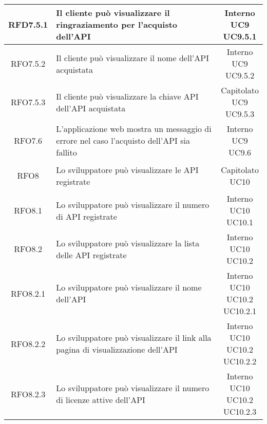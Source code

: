 \begin{longtable}{|c|p{8cm}|c|}
\hypertarget{RFD7.5.1}{RFD7.5.1} & Il cliente può visualizzare il ringraziamento per l'acquisto dell'API & \makecell*{Interno\\UC9\\UC9.5.1} \\
\hline
\hypertarget{RFO7.5.2}{RFO7.5.2} & Il cliente può visualizzare il nome dell'API acquistata & \makecell*{Interno\\UC9\\UC9.5.2} \\
\hline
\hypertarget{RFO7.5.3}{RFO7.5.3} & Il cliente può visualizzare la chiave API dell'API acquistata & \makecell*{Capitolato\\UC9\\UC9.5.3} \\
\hline

\hypertarget{RFO7.6}{RFO7.6} & L'applicazione web mostra un messaggio di errore nel caso l'acquisto dell'API sia fallito & \makecell*{Interno\\UC9\\UC9.6} \\
\hline

\hypertarget{RFO8}{RFO8} & Lo sviluppatore può visualizzare le API registrate & \makecell*{Capitolato\\UC10} \\
\hline

\hypertarget{RFO8.1}{RFO8.1} & Lo sviluppatore può visualizzare il numero di API registrate & \makecell*{Interno\\UC10\\UC10.1} \\
\hline

\hypertarget{RFO8.2}{RFO8.2} & Lo sviluppatore può visualizzare la lista delle API registrate & \makecell*{Interno\\UC10\\UC10.2} \\
\hline
\hypertarget{RFO8.2.1}{RFO8.2.1} & Lo sviluppatore può visualizzare il nome dell'API & \makecell*{Interno\\UC10\\UC10.2\\UC10.2.1} \\
\hline
\hypertarget{RFO8.2.2}{RFO8.2.2} & Lo sviluppatore può visualizzare il link alla pagina di visualizzazione dell'API & \makecell*{Interno\\UC10\\UC10.2\\UC10.2.2} \\
\hline
\hypertarget{RFO8.2.3}{RFO8.2.3} & Lo sviluppatore può visualizzare il numero di licenze attive dell'API & \makecell*{Interno\\UC10\\UC10.2\\UC10.2.3} \\
\hline


\end{longtable}
